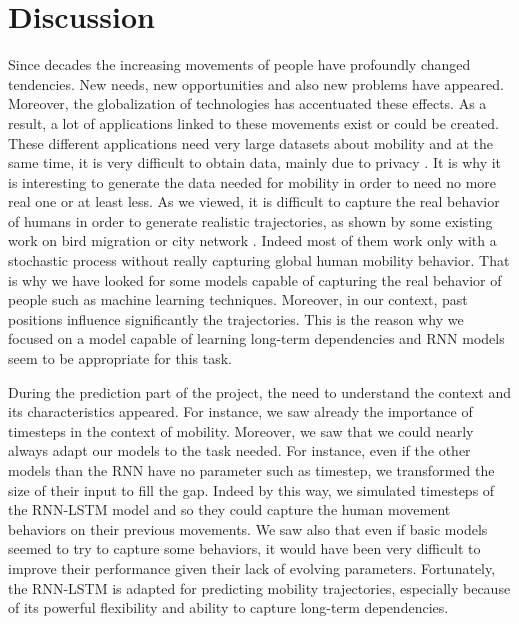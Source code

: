 \documentclass[a4]{article}
\begin{document}
\section{Discussion}
Since decades the increasing movements of people have profoundly changed tendencies. New needs, new opportunities and also new problems have appeared. Moreover, the globalization of technologies has accentuated these effects. As a result, a lot of applications linked to these movements exist or could be created. These different applications need very large datasets about mobility and at the same time, it is very difficult to obtain data, mainly due to privacy \cite{kulkarni}. It is why it is interesting to generate the data needed for mobility in order to need no more real one or at least less. As we viewed, it is difficult to capture the real behavior of humans in order to generate realistic trajectories, as shown by some existing work on bird migration \cite{technitis} or city network \cite{jiang2009characterizing}. Indeed most of them work only with a stochastic process without really capturing global human mobility behavior. That is why we have looked for some models capable of capturing the real behavior of people such as machine learning techniques. Moreover, in our context, past positions influence significantly the trajectories. This is the reason why we focused on a model capable of learning long-term dependencies and RNN models seem to be appropriate \cite{kulkarni} for this task.

During the prediction part of the project, the need to understand the context and its characteristics appeared. For instance, we saw already the importance of timesteps in the context of mobility. Moreover, we saw that we could nearly always adapt our models to the task needed. For instance, even if the other models than the RNN have no parameter such as timestep, we transformed the size of their input to fill the gap. Indeed by this way, we simulated timesteps of the RNN-LSTM model and so they could capture the human movement behaviors on their previous movements. We saw also that even if basic models seemed to try to capture some behaviors, it would have been very difficult to improve their performance given their lack of evolving parameters. Fortunately, the RNN-LSTM is adapted for predicting mobility trajectories, especially because of its powerful flexibility and ability to capture long-term dependencies. 
\end{document}
